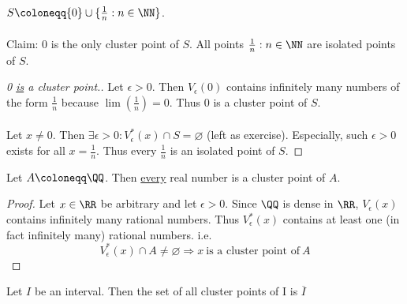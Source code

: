 \documentclass[class=scrartcl, crop=false]{standalone}
\begin{document}
\begin{example}
  $S \coloneqq \{0\} \cup \{ \frac{1}{n} : n \in \NN\}$.
  \\\\
  Claim: 0 is the only cluster point of $S$. All points $\frac{1}{n}: n \in \NN$ are isolated points of $S$.
  \begin{proof}[0 \ul{is} a cluster point.]
    Let $\epsilon > 0$. Then $V_\epsilon(0)$ contains infinitely many numbers of the form $\frac{1}{n}$ because $\lim(\frac{1}{n}) = 0$. Thus $0$ is a cluster point of $S$.
    \\\\
    Let $x \neq 0$. Then $\exists \epsilon > 0 : V_\epsilon^*(x) \cap S = \varnothing$ (left as exercise). Especially, such $\epsilon > 0$ exists for all $x = \frac{1}{n}$. Thus every $\frac{1}{n}$ is an isolated point of $S$.
  \end{proof} 
\end{example} 
\begin{example}
  Let $A \coloneqq \QQ$. Then \ul{every} real number is a cluster point of $A$.
  \begin{proof}
    Let $x \in \RR$ be arbitrary and let $\epsilon > 0$. Since $\QQ$ is dense in $\RR$, $V_\epsilon(x)$ contains infinitely many rational numbers. Thus $V_\epsilon^*(x)$ contains at least one (in fact infinitely many) rational numbers. i.e.
    \[
      V_\epsilon^*(x) \cap A \neq \varnothing \Rightarrow x \ \text{is a cluster point of} \ A
    \]
  \end{proof} 
\end{example} 
\begin{exercise}
  Let $I$ be an interval. Then the set of all cluster points of I is $\overline{I}$
\end{exercise} 
\end{document}
